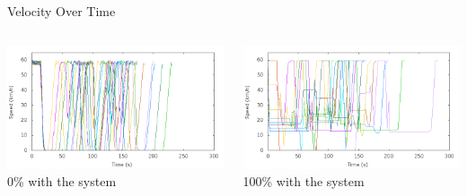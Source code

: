 \begin{frame}{Velocity Over Time}
\begin{columns}
	\begin{column}{0.5\textwidth}
	\includegraphics[width=1\textwidth]{images/tp0/speed0.png}\\
	0\% with the system
	\end{column}
	\begin{column}{0.5\textwidth}
	\includegraphics[width=1\textwidth]{images/tp0/speed100.png}\\
	100\% with the system
	\end{column}
\end{columns}
\end{frame}
